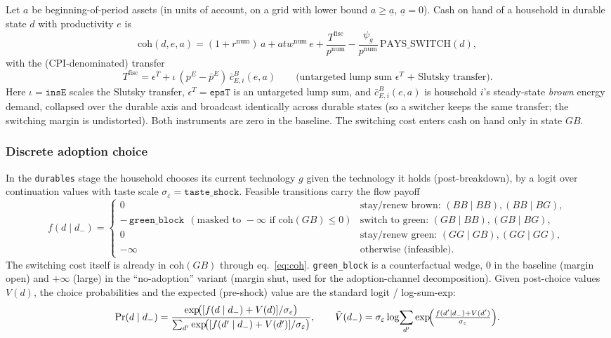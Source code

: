 \documentclass[11pt,a4paper]{article}
\newcommand{\num}{\mathrm{num}}
\newcommand{\pE}{p^{E}}
\newcommand{\coh}{\mathrm{coh}}
\begin{document}
Let $a$ be beginning-of-period assets (in units of account, on a grid with lower
bound $a\ge \underline a$, $\underline a=0$). Cash on hand of a household in
durable state $d$ with productivity $e$ is
\begin{equation}
\coh(d,e,a)=(1+r^{\num})\,a+atw^{\num}\,e
+\frac{T^{\text{fisc}}}{p^{\num}}
-\frac{\psi_g}{p^{\num}}\,\mathrm{PAYS\_SWITCH}(d),
\label{eq:coh}
\end{equation}
with the (CPI-denominated) transfer
\begin{equation}
T^{\text{fisc}} = \epsilon^{T}+\iota\,(\pE-\bar\pE)\,\bar c^{B}_{E,i}(e,a)
\qquad\text{(untargeted lump sum $\epsilon^{T}$ + Slutsky transfer).}
\end{equation}
Here $\iota=\texttt{insE}$ scales the Slutsky transfer, $\epsilon^{T}=\texttt{epsT}$
is an untargeted lump sum, and $\bar c^{B}_{E,i}(e,a)$ is household $i$'s
steady-state \emph{brown} energy demand, collapsed over the durable axis and
broadcast identically across durable states (so a switcher keeps the same
transfer; the switching margin is undistorted). Both instruments are zero in the
baseline. The switching cost enters cash on hand only in state $GB$.

\subsubsection{Discrete adoption choice}\label{sec:logit}

In the \texttt{durables} stage the household chooses its current technology $g$
given the technology it holds (post-breakdown), by a logit over continuation
values with taste scale $\sigma_\varepsilon=\texttt{taste\_shock}$. Feasible
transitions carry the flow payoff
\begin{equation}
f(d\mid d_-)=
\begin{cases}
0 & \text{stay/renew brown: } (BB\mid BB),(BB\mid BG),\\
-\,\texttt{green\_block}\ \ (\text{masked to }-\infty\text{ if }\coh(GB)\le 0)
& \text{switch to green: } (GB\mid BB),(GB\mid BG),\\
0 & \text{stay/renew green: } (GG\mid GB),(GG\mid GG),\\
-\infty & \text{otherwise (infeasible).}
\end{cases}
\end{equation}
The switching cost itself is already in $\coh(GB)$ through
eq.~\eqref{eq:coh}. \texttt{green\_block} is a counterfactual wedge, $0$ in the
baseline (margin open) and $+\infty$ (large) in the ``no-adoption'' variant
(margin shut, used for the adoption-channel decomposition). Given post-choice
values $V(d)$, the choice probabilities and the expected (pre-shock) value are
the standard logit / log-sum-exp:
\begin{equation}
\Pr(d\mid d_-)=\frac{\exp\!\bigl([f(d\mid d_-)+V(d)]/\sigma_\varepsilon\bigr)}
{\sum_{d'}\exp\!\bigl([f(d'\mid d_-)+V(d')]/\sigma_\varepsilon\bigr)},
\qquad
\tilde V(d_-)=\sigma_\varepsilon\log\!\sum_{d'}\exp\!\Bigl(\tfrac{f(d'\mid d_-)+V(d')}{\sigma_\varepsilon}\Bigr).
\end{equation}
\end{document}
